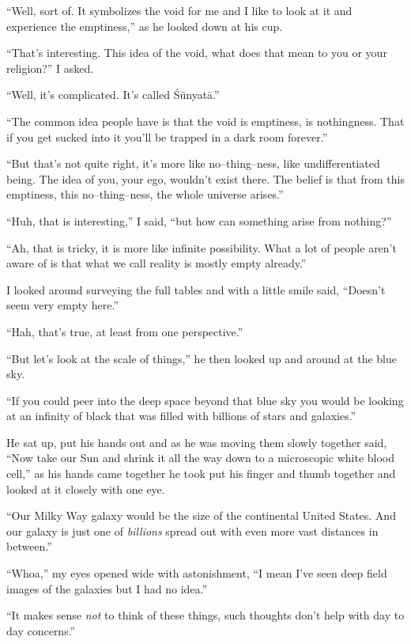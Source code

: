 ``Well, sort of. It symbolizes the void for me and I like to
look at it and experience the emptiness,'' as he looked down at
his cup.

``That's interesting. This idea of the void, what does that mean
to you or your religion?'' I asked.

``Well, it's complicated. It's called
\'{S}\={u}nyat\={a}.''

``The common idea people have is that the void is emptiness, is nothingness.
That if you get sucked into it you'll be trapped in a dark room
forever.''

``But that's not quite right, it's more like no--thing--ness, like
undifferentiated being. The idea of you, your ego, wouldn't
exist there. The belief is that from this
emptiness, this no--thing--ness, the whole universe arises.''

``Huh, that is interesting,'' I said, ``but how can something
arise from nothing?''

``Ah, that is tricky, it is more like infinite possibility. What
a lot of people aren't aware of is that what we call reality is
mostly empty already.''

I looked around surveying the full tables and with a little
smile said, ``Doesn't seem very empty here.''

``Hah, that's true, at least from one
perspective.''

``But let's look at the scale of things,'' he then
looked up and around at the blue sky.

``If you could peer into the deep space beyond that blue sky you
would be looking at an infinity of black that was filled
with billions of stars and galaxies.''

He sat up, put his hands out and as he was moving them slowly
together said, ``Now take our Sun and shrink it all the way
down to a microscopic white blood cell,'' as his hands came
together he took put his finger and thumb together
and looked at it closely with one eye.

``Our Milky Way
galaxy would be the size of the continental United States. And
our galaxy is just one of \emph{billions} spread out with even
more vast distances in between.''

``Whoa,'' my eyes opened wide with astonishment, ``I mean I've seen
deep field images of the galaxies but I had no idea.''

``It makes sense \emph{not} to think of these things, such thoughts
don't help with day to day concerns.''

